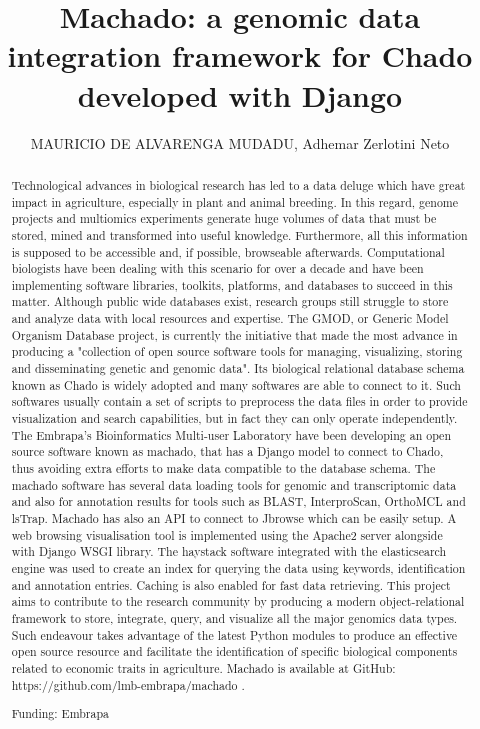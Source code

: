 \documentclass[twoside]{article}
\title{\vspace{-15mm}\fontsize{24pt}{10pt}\selectfont\textbf{ Machado: a genomic data integration framework for Chado developed with Django }} %
\author{ MAURICIO DE ALVARENGA MUDADU, Adhemar Zerlotini Neto }
\affil{ Embrapa Inform\'atica Agropecu\'aria }
\date{}
\begin{document}
  
  
  \maketitle %
  
  
  \thispagestyle{fancy} %
  
  
  \begin{abstract}
  Technological advances in biological research has led to a data deluge which have great impact in agriculture,  especially in plant and animal breeding. In this regard,  genome projects and multiomics experiments generate huge volumes of data that must be stored,  mined and transformed into useful knowledge. Furthermore,  all this information is supposed to be accessible and,  if possible,  browseable afterwards. Computational biologists have been dealing with this scenario for over a decade and have been implementing software libraries,  toolkits,  platforms,  and databases to succeed in this matter.
Although public wide databases exist,  research groups still struggle to store and analyze data with local resources and expertise. The GMOD,  or Generic Model Organism Database project,  is currently the initiative that made the most advance in producing a "collection of open source software tools for managing,  visualizing,  storing and disseminating genetic and genomic data". Its biological relational database schema known as Chado is widely adopted and many softwares are able to connect to it. Such softwares usually contain a set of scripts to preprocess the data files in order to provide visualization and search capabilities,  but in fact they can only operate independently. 
The Embrapa’s Bioinformatics Multi-user Laboratory have been developing an open source software known as machado,  that has a Django model to connect to Chado,  thus avoiding extra efforts to make data compatible to the database schema. The machado software has several data loading tools for genomic and transcriptomic data and also for annotation results for tools such as BLAST,  InterproScan,  OrthoMCL and lsTrap. Machado has also an API to connect to Jbrowse which can be easily setup. A web browsing visualisation tool is implemented using the Apache2 server alongside with Django WSGI library. The haystack software integrated with the elasticsearch engine was used to create an index for querying the data using keywords,  identification and annotation entries. Caching is also enabled for fast data retrieving.
This project aims to contribute to the research community by producing a modern object-relational framework to store,  integrate,  query,  and visualize all the major genomics data types. Such endeavour takes advantage of the latest Python modules to produce an effective open source resource and facilitate the identification of specific biological components related to economic traits in agriculture. Machado is available at GitHub: https://github.com/lmb-embrapa/machado .
  
  Funding: Embrapa \\ 
  \end{abstract}
  
\end{document}
